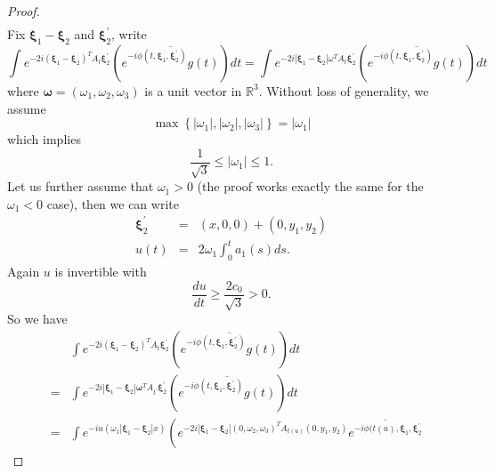 \documentclass[reqno]{amsart}
\theoremstyle{plain}
\numberwithin{equation}{section}
\begin{document}
\begin{proof}
\begin{eqnarray*}
\end{eqnarray*}Fix $\mathbf{\xi }_{1}-\mathbf{\xi }_{2}$ and $\mathbf{\xi }_{2}^{\prime }$,
write 
\begin{equation*}
\int e^{-2i\left( \mathbf{\xi }_{1}-\mathbf{\xi }_{2}\right) ^{T}A_{t}\mathbf{\xi }_{2}^{\prime }}\left( \overline{e^{-i\phi (t,\mathbf{\xi }_{1},\mathbf{\xi }_{2}^{\prime })}g(t)}\right) dt=\int e^{-2i\left\vert \mathbf{\xi }_{1}-\mathbf{\xi }_{2}\right\vert \omega ^{T}A_{t}\mathbf{\xi }_{2}^{\prime }}\left( \overline{e^{-i\phi (t,\mathbf{\xi }_{1},\mathbf{\xi }_{2}^{\prime })}g(t)}\right) dt
\end{equation*}where $\mathbf{\omega }=(\omega _{1},\omega _{2},\omega _{3})$ is a unit
vector in $\mathbb{R}^{3}$. Without loss of generality, we assume\begin{equation*}
\max \left\{ \left\vert \omega _{1}\right\vert ,\left\vert \omega
_{2}\right\vert ,\left\vert \omega _{3}\right\vert \right\} =\left\vert
\omega _{1}\right\vert
\end{equation*}which implies 
\begin{equation*}
\frac{1}{\sqrt{3}}\leqslant \left\vert \omega _{1}\right\vert \leqslant 1.
\end{equation*}Let us further assume that $\omega _{1}>0$ (the proof works exactly the same
for the $\omega _{1}<0$ case), then we can write 
\begin{eqnarray*}
\mathbf{\xi }_{2}^{\prime } &=&(x,0,0)+(0,y_{1},y_{2}) \\
u(t) &=&2\omega _{1}\int_{0}^{t}a_{1}(s)ds.
\end{eqnarray*}Again $u$ is invertible with 
\begin{equation*}
\frac{du}{dt}\geqslant \frac{2c_{0}}{\sqrt{3}}>0.
\end{equation*}So we have\begin{eqnarray*}
&&\int e^{-2i\left( \mathbf{\xi }_{1}-\mathbf{\xi }_{2}\right) ^{T}A_{t}\mathbf{\xi }_{2}^{\prime }}\left( \overline{e^{-i\phi (t,\mathbf{\xi }_{1},\mathbf{\xi }_{2}^{\prime })}g(t)}\right) dt \\
&=&\int e^{-2i\left\vert \mathbf{\xi }_{1}-\mathbf{\xi }_{2}\right\vert 
\mathbf{\omega }^{T}A_{t^{\prime }}\mathbf{\xi }_{2}^{\prime }}\left( 
\overline{e^{-i\phi (t,\mathbf{\xi }_{1},\mathbf{\xi }_{2}^{\prime })}g(t)}\right) dt \\
&=&\int e^{-iu\left( \omega _{1}\left\vert \mathbf{\xi }_{1}-\mathbf{\xi }_{2}\right\vert x\right) }\left( e^{-2i\left\vert \mathbf{\xi }_{1}-\mathbf{\xi }_{2}\right\vert (0,\omega _{2},\omega _{3})^{T}A_{t(u)}(0,y_{1},y_{2})}\overline{e^{-i\phi (t(u),\mathbf{\xi }_{1},\mathbf{\xi }_{2}^{\prime
}}}
\end{eqnarray*}
\end{proof}
\end{document}
